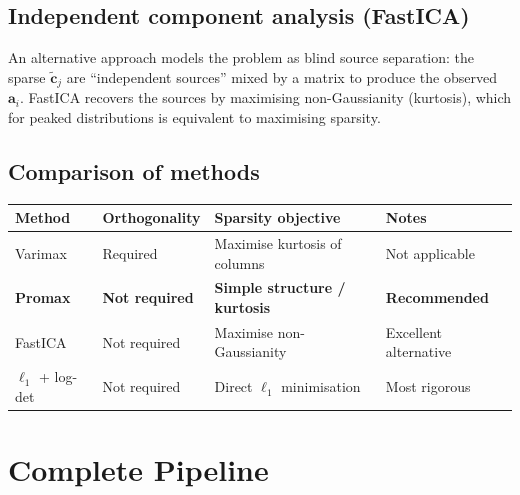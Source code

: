 \documentclass[a4paper,11pt]{article}
\newcommand{\va}{\bm{a}}
\newcommand{\vct}{\tilde{\bm{c}}}
\theoremstyle{plain}
\begin{document}
\subsection{Independent component analysis (FastICA)}
\label{sec:ica}

An alternative approach models the problem as blind source separation: the sparse $\vct_j$ are ``independent sources'' mixed by a matrix to produce the observed $\va_i$.
FastICA recovers the sources by maximising non-Gaussianity (kurtosis), which for peaked distributions is equivalent to maximising sparsity.

\subsection{Comparison of methods}
\label{sec:comparison}

\begin{center}
\begin{tabular}{llll}
\toprule
Method & Orthogonality & Sparsity objective & Notes \\
\midrule
Varimax & Required & Maximise kurtosis of columns & Not applicable \\
\textbf{Promax} & \textbf{Not required} & \textbf{Simple structure / kurtosis} & \textbf{Recommended} \\
FastICA & Not required & Maximise non-Gaussianity & Excellent alternative \\
$\ell_1$ + log-det & Not required & Direct $\ell_1$ minimisation & Most rigorous \\
\bottomrule
\end{tabular}
\end{center}

\section{Complete Pipeline}
\label{sec:pipeline}
\end{document}

